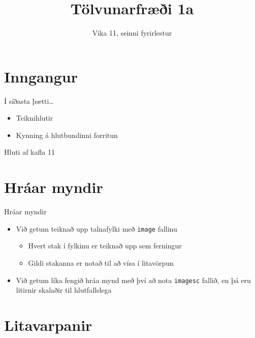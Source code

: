\documentclass[handout]{beamer}
\title{Tölvunarfræði 1a}
\subtitle{Vika 11, seinni fyrirlestur}
\begin{document}
\begin{frame}
\titlepage
\end{frame}

\section{Inngangur}

\begin{frame}{Í síðasta þætti\ldots}
\begin{itemize}
    \item Teiknihlutir
    \item Kynning á hlutbundinni forritun
\end{itemize}
Hluti af kafla 11
\end{frame}

\section{Hráar myndir}

\begin{frame}{Hráar myndir}
\begin{itemize}
 \item Við getum teiknað upp talnafylki með \texttt{image} fallinu
 \begin{itemize}
  \item Hvert stak í fylkinu er teiknað upp sem ferningur
  \item Gildi stakanna er notað til að vísa í litavörpun
 \end{itemize}
 \item Við getum líka fengið hráa mynd með því að nota \texttt{imagesc} fallið, en þá eru litirnir skalaðir til hlutfallslega
\end{itemize}
\end{frame}

\section{Litavarpanir}
\end{document}
